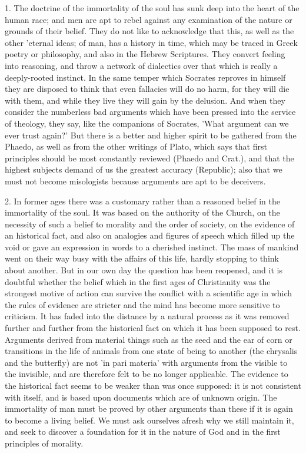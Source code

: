 1. The doctrine of the immortality of the soul has sunk deep into the
heart of the human race; and men are apt to rebel against any examination
of the nature or grounds of their belief. They do not like to acknowledge
that this, as well as the other 'eternal ideas; of man, has a history in
time, which may be traced in Greek poetry or philosophy, and also in the
Hebrew Scriptures. They convert feeling into reasoning, and throw a
network of dialectics over that which is really a deeply-rooted instinct.
In the same temper which Socrates reproves in himself they are disposed to
think that even fallacies will do no harm, for they will die with them,
and while they live they will gain by the delusion. And when they consider
the numberless bad arguments which have been pressed into the service of
theology, they say, like the companions of Socrates, 'What argument can we
ever trust again?' But there is a better and higher spirit to be gathered
from the Phaedo, as well as from the other writings of Plato, which says
that first principles should be most constantly reviewed (Phaedo and
Crat.), and that the highest subjects demand of us the greatest accuracy
(Republic); also that we must not become misologists because arguments are
apt to be deceivers.

2. In former ages there was a customary rather than a reasoned belief in
the immortality of the soul. It was based on the authority of the Church,
on the necessity of such a belief to morality and the order of society, on
the evidence of an historical fact, and also on analogies and figures of
speech which filled up the void or gave an expression in words to a
cherished instinct. The mass of mankind went on their way busy with the
affairs of this life, hardly stopping to think about another. But in our
own day the question has been reopened, and it is doubtful whether the
belief which in the first ages of Christianity was the strongest motive of
action can survive the conflict with a scientific age in which the rules
of evidence are stricter and the mind has become more sensitive to
criticism. It has faded into the distance by a natural process as it was
removed further and further from the historical fact on which it has been
supposed to rest. Arguments derived from material things such as the seed
and the ear of corn or transitions in the life of animals from one state
of being to another (the chrysalis and the butterfly) are not 'in pari
materia' with arguments from the visible to the invisible, and are
therefore felt to be no longer applicable. The evidence to the historical
fact seems to be weaker than was once supposed: it is not consistent with
itself, and is based upon documents which are of unknown origin. The
immortality of man must be proved by other arguments than these if it is
again to become a living belief. We must ask ourselves afresh why we still
maintain it, and seek to discover a foundation for it in the nature of God
and in the first principles of morality.

